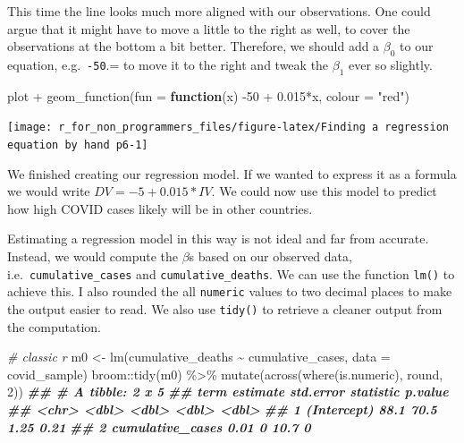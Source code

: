 \documentclass[
]{book}
\newenvironment{Shaded}{\begin{snugshade}}{\end{snugshade}}
\newcommand{\AttributeTok}[1]{\textcolor[rgb]{0.77,0.63,0.00}{#1}}
\newcommand{\CommentTok}[1]{\textcolor[rgb]{0.56,0.35,0.01}{\textit{#1}}}
\newcommand{\ControlFlowTok}[1]{\textcolor[rgb]{0.13,0.29,0.53}{\textbf{#1}}}
\newcommand{\DecValTok}[1]{\textcolor[rgb]{0.00,0.00,0.81}{#1}}
\newcommand{\DocumentationTok}[1]{\textcolor[rgb]{0.56,0.35,0.01}{\textbf{\textit{#1}}}}
\newcommand{\FloatTok}[1]{\textcolor[rgb]{0.00,0.00,0.81}{#1}}
\newcommand{\FunctionTok}[1]{\textcolor[rgb]{0.00,0.00,0.00}{#1}}
\newcommand{\NormalTok}[1]{#1}
\newcommand{\OtherTok}[1]{\textcolor[rgb]{0.56,0.35,0.01}{#1}}
\newcommand{\SpecialCharTok}[1]{\textcolor[rgb]{0.00,0.00,0.00}{#1}}
\newcommand{\StringTok}[1]{\textcolor[rgb]{0.31,0.60,0.02}{#1}}
\begin{document}
This time the line looks much more aligned with our observations. One could argue that it might have to move a little to the right as well, to cover the observations at the bottom a bit better. Therefore, we should add a \(\beta_0\) to our equation, e.g.~\texttt{-50}.= to move it to the right and tweak the \(\beta_1\) ever so slightly.

\begin{Shaded}
\begin{Highlighting}[]
\NormalTok{plot }\SpecialCharTok{+}
  \FunctionTok{geom\_function}\NormalTok{(}\AttributeTok{fun =} \ControlFlowTok{function}\NormalTok{(x) }\SpecialCharTok{{-}}\DecValTok{50} \SpecialCharTok{+} \FloatTok{0.015}\SpecialCharTok{*}\NormalTok{x, }\AttributeTok{colour =} \StringTok{"red"}\NormalTok{)}
\end{Highlighting}
\end{Shaded}

\begin{center}\texttt{[image: r\_for\_non\_programmers\_files/figure-latex/Finding a regression equation by hand p6-1]} \end{center}

We finished creating our regression model. If we wanted to express it as a formula we would write \(DV = -5 + 0.015 * IV\). We could now use this model to predict how high COVID cases likely will be in other countries.

Estimating a regression model in this way is not ideal and far from accurate. Instead, we would compute the \(\beta\)s based on our observed data, i.e.~\texttt{cumulative\_cases} and \texttt{cumulative\_deaths}. We can use the function \texttt{lm()} to achieve this. I also rounded the all \texttt{numeric} values to two decimal places to make the output easier to read. We also use \texttt{tidy()} to retrieve a cleaner output from the computation.

\begin{Shaded}
\begin{Highlighting}[]
\CommentTok{\# classic r}
\NormalTok{m0 }\OtherTok{\textless{}{-}} \FunctionTok{lm}\NormalTok{(cumulative\_deaths }\SpecialCharTok{\textasciitilde{}}\NormalTok{ cumulative\_cases, }\AttributeTok{data =}\NormalTok{ covid\_sample)}
\NormalTok{broom}\SpecialCharTok{::}\FunctionTok{tidy}\NormalTok{(m0) }\SpecialCharTok{\%\textgreater{}\%} \FunctionTok{mutate}\NormalTok{(}\FunctionTok{across}\NormalTok{(}\FunctionTok{where}\NormalTok{(is.numeric), round, }\DecValTok{2}\NormalTok{))}
\DocumentationTok{\#\# \# A tibble: 2 x 5}
\DocumentationTok{\#\#   term             estimate std.error statistic p.value}
\DocumentationTok{\#\#   \textless{}chr\textgreater{}               \textless{}dbl\textgreater{}     \textless{}dbl\textgreater{}     \textless{}dbl\textgreater{}   \textless{}dbl\textgreater{}}
\DocumentationTok{\#\# 1 (Intercept)         88.1       70.5      1.25    0.21}
\DocumentationTok{\#\# 2 cumulative\_cases     0.01       0       10.7     0}
\end{Highlighting}
\end{Shaded}
\end{document}
